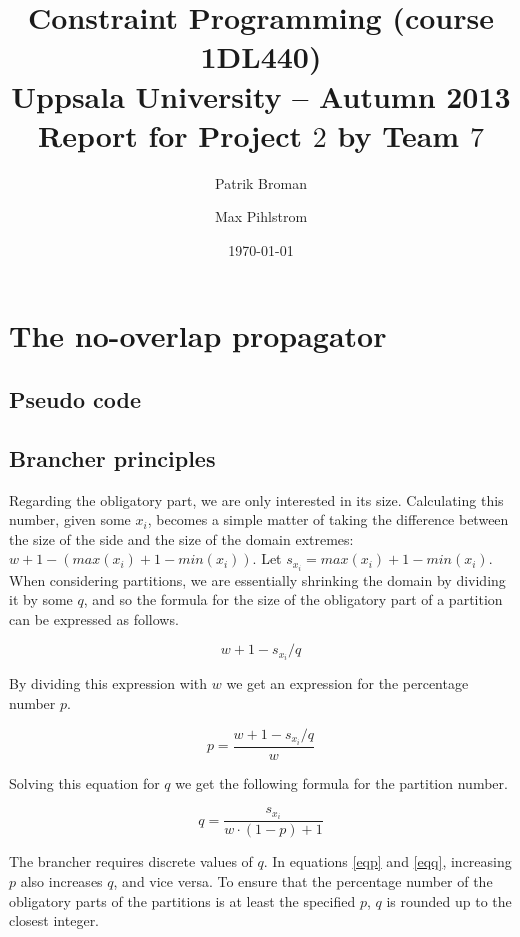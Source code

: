 \documentclass[a4paper,11pt]{article}
\title{\textbf{Constraint Programming (course 1DL440) \\
    Uppsala University -- Autumn 2013 \\
    Report for Project $2$
    by Team $7$  %
  }
}
\author{Patrik Broman \and Max Pihlstrom} %
\date{\today}
\begin{document}
\maketitle
\newpage
\section{The no-overlap propagator}

\subsection{Pseudo code}



\subsection{Brancher principles}

Regarding the obligatory part, we are only interested in its size. Calculating this number, given some $x_i$, becomes a simple matter of taking the difference between the size of the side and the size of the domain extremes: $w + 1 - (max(x_i) + 1 - min(x_i))$. Let $s_{x_i} = max(x_i) + 1 - min(x_i)$.  When considering partitions, we are essentially shrinking the domain by dividing it by some $q$, and so the formula for the size of the obligatory part of a partition can be expressed as follows.

\begin{equation}
w + 1 - s_{x_i}/q
\end{equation}

By dividing this expression with $w$ we get an expression for the percentage number $p$.

\begin{equation}
\label{eqp}
p = \frac{w + 1 - s_{x_i}/q}{w}
\end{equation}

Solving this equation for $q$ we get the following formula for the partition number.

\begin{equation}
\label{eqq}
q = \frac{s_{x_i}}{w\cdot(1-p)+1}
\end{equation}

The brancher requires discrete values of $q$. In equations \eqref{eqp} and \eqref{eqq}, increasing $p$ also increases $q$, and vice versa. To ensure that the percentage number of the obligatory parts of the partitions is at least the specified $p$, $q$ is rounded up to the closest integer.
\end{document}
